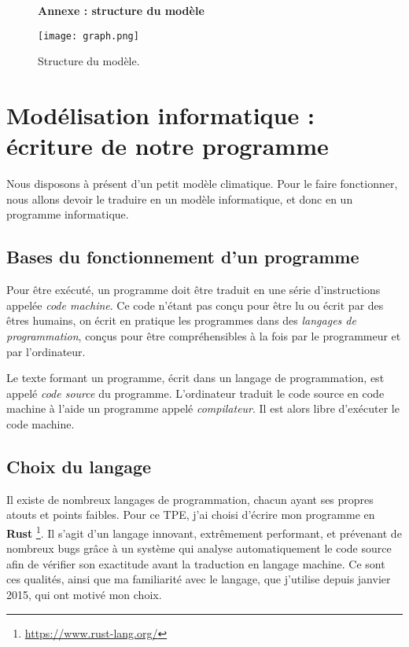 \documentclass[12pt]{article}
\begin{document}
\clearpage
\begin{figure}[!htb]
	\centering
	{ \Large \textbf{Annexe : structure du modèle} \par\medskip }
	\centerline{\texttt{[image: graph.png]}}
	\caption{Structure du modèle.}
	\label{fig:model-structure}
\end{figure}

\clearpage
\section{Modélisation informatique : écriture de notre programme}

Nous disposons à présent d'un petit modèle climatique.
Pour le faire fonctionner, nous allons devoir le traduire en un modèle informatique, et donc en un programme informatique.

\subsection{Bases du fonctionnement d'un programme}

Pour être exécuté, un programme doit être traduit en une série d'instructions appelée \emph{code machine}.
Ce code n'étant pas conçu pour être lu ou écrit par des êtres humains, on écrit en pratique les programmes dans des \emph{langages de programmation}, conçus pour être compréhensibles à la fois par le programmeur et par l'ordinateur.

Le texte formant un programme, écrit dans un langage de programmation, est appelé \emph{code source} du programme.
L'ordinateur traduit le code source en code machine à l'aide un programme appelé \emph{compilateur}.
Il est alors libre d'exécuter le code machine.


\subsection{Choix du langage}

Il existe de nombreux langages de programmation, chacun ayant ses propres atouts et points faibles.
Pour ce TPE, j'ai choisi d'écrire mon programme en \textbf{Rust} \footnote{\url{https://www.rust-lang.org/}}.
Il s'agit d'un langage innovant, extrêmement performant, et prévenant de nombreux bugs grâce à un système qui analyse automatiquement le code source afin de vérifier son exactitude avant la traduction en langage machine.
Ce sont ces qualités, ainsi que ma familiarité avec le langage, que j'utilise depuis janvier 2015, qui ont motivé mon choix.
\end{document}
